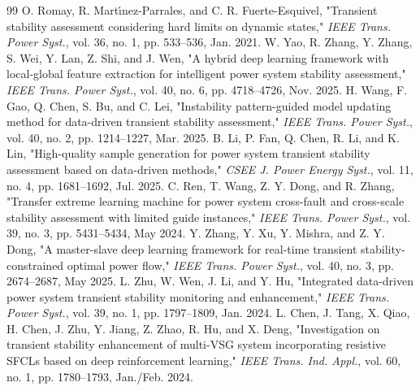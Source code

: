 \documentclass[conference]{IEEEtran}
\begin{document}
\begin{thebibliography}{99}
 O. Romay, R. Mart\'{\i}nez-Parrales, and C. R. Fuerte-Esquivel, "Transient stability assessment considering hard limits on dynamic states," \emph{IEEE Trans. Power Syst.}, vol. 36, no. 1, pp. 533--536, Jan. 2021.
 W. Yao, R. Zhang, Y. Zhang, S. Wei, Y. Lan, Z. Shi, and J. Wen, "A hybrid deep learning framework with local-global feature extraction for intelligent power system stability assessment," \emph{IEEE Trans. Power Syst.}, vol. 40, no. 6, pp. 4718--4726, Nov. 2025.
 H. Wang, F. Gao, Q. Chen, S. Bu, and C. Lei, "Instability pattern-guided model updating method for data-driven transient stability assessment," \emph{IEEE Trans. Power Syst.}, vol. 40, no. 2, pp. 1214--1227, Mar. 2025.
 B. Li, P. Fan, Q. Chen, R. Li, and K. Lin, "High-quality sample generation for power system transient stability assessment based on data-driven methods," \emph{CSEE J. Power Energy Syst.}, vol. 11, no. 4, pp. 1681--1692, Jul. 2025.
 C. Ren, T. Wang, Z. Y. Dong, and R. Zhang, "Transfer extreme learning machine for power system cross-fault and cross-scale stability assessment with limited guide instances," \emph{IEEE Trans. Power Syst.}, vol. 39, no. 3, pp. 5431--5434, May 2024.
 Y. Zhang, Y. Xu, Y. Mishra, and Z. Y. Dong, "A master-slave deep learning framework for real-time transient stability-constrained optimal power flow," \emph{IEEE Trans. Power Syst.}, vol. 40, no. 3, pp. 2674--2687, May 2025.
 L. Zhu, W. Wen, J. Li, and Y. Hu, "Integrated data-driven power system transient stability monitoring and enhancement," \emph{IEEE Trans. Power Syst.}, vol. 39, no. 1, pp. 1797--1809, Jan. 2024.
 L. Chen, J. Tang, X. Qiao, H. Chen, J. Zhu, Y. Jiang, Z. Zhao, R. Hu, and X. Deng, "Investigation on transient stability enhancement of multi-VSG system incorporating resistive SFCLs based on deep reinforcement learning," \emph{IEEE Trans. Ind. Appl.}, vol. 60, no. 1, pp. 1780--1793, Jan./Feb. 2024.
\end{thebibliography}
\end{document}
